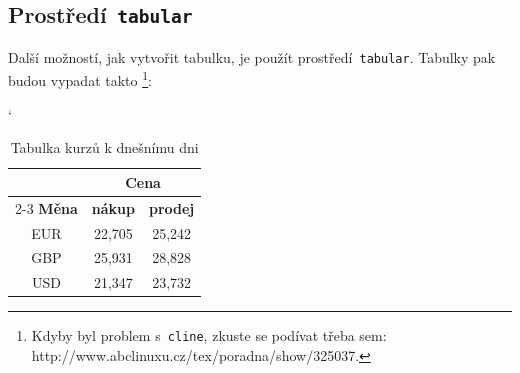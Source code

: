 \documentclass[a4paper, 11pt]{article}
\begin{document}
\subsection{Prostředí\texttt{ tabular}}
Další možností, jak vytvořit tabulku, je použít prostředí\texttt{ tabular}. Tabulky pak budou vypadat takto
\footnote{Kdyby byl problem s\texttt{ cline}, zkuste se podívat třeba sem: http://www.abclinuxu.cz/tex/poradna/show/325037. }:

\begin{table}[ht]
\begin{center}
\catcode`
\begin{tabular}{|c|c|c|} \hline
 &   \multicolumn{2}{|c|}{\textbf{Cena}} \\ \cline{2-3}
\textbf{Měna}   & \textbf{nákup}    & \textbf{prodej} \\ \hline
EUR             & 22,705            & 25,242 \\
GBP             & 25,931            & 28,828 \\
USD             & 21,347            & 23,732 \\ \hline
\end{tabular}
\caption{Tabulka kurzů k dnešnímu dni}
\label{tab:meny}
\end{center}
\end{table}
\end{document}
